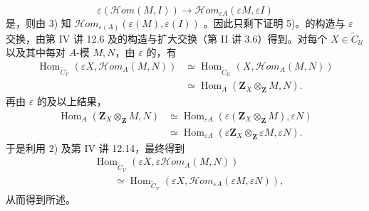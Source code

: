 \[
 \varepsilon(\mathscr{H}om(M,I))\longrightarrow
 \mathscr{H}om_{\varepsilon A}(\varepsilon M,\varepsilon I)
\]
是，则由 3) 知 $\mathscr{H}om_{\varepsilon(A)}(\varepsilon(M),\varepsilon(I))$ 。因此只剩下证明 5)。的构造与 $\varepsilon$ 交换，由第 IV 讲 12.6 及的构造与扩大交换（第 II 讲 3.6）得到。对每个 $X\in\widetilde C_{\mathcal U}$ 以及其中每对 $A$-模 $M,N$，由 $\varepsilon$ 的，有
\[
\begin{split}
 \operatorname{Hom}_{\widetilde C_{\mathcal V}}(\varepsilon X,\mathscr{H}om_A(M,N))
 &\simeq\operatorname{Hom}_{\widetilde C_{\mathcal U}}(X,\mathscr{H}om_A(M,N))\\
 &\simeq\operatorname{Hom}_A(\mathbf Z_X\otimes_{\mathbf Z}M,N).
\end{split}
\]
再由 $\varepsilon$ 的及以上结果，
\[
\begin{split}
 \operatorname{Hom}_A(\mathbf Z_X\otimes_{\mathbf Z}M,N)
 &\simeq\operatorname{Hom}_{\varepsilon A}(\varepsilon(\mathbf Z_X\otimes_{\mathbf Z}M),\varepsilon N)\\
 &\simeq\operatorname{Hom}_{\varepsilon A}(\varepsilon\mathbf Z_X\otimes_{\mathbf Z}\varepsilon M,\varepsilon N).
\end{split}
\]
于是利用 2) 及第 IV 讲 12.14，最终得到
\[
\begin{split}
 &\operatorname{Hom}_{\widetilde C_{\mathcal V}}(\varepsilon X,\varepsilon\mathscr{H}om_A(M,N))\\
 &\qquad\simeq\operatorname{Hom}_{\widetilde C_{\mathcal V}}(\varepsilon X,\mathscr{H}om_{\varepsilon A}(\varepsilon M,\varepsilon N)),
\end{split}
\]
从而得到所述。


